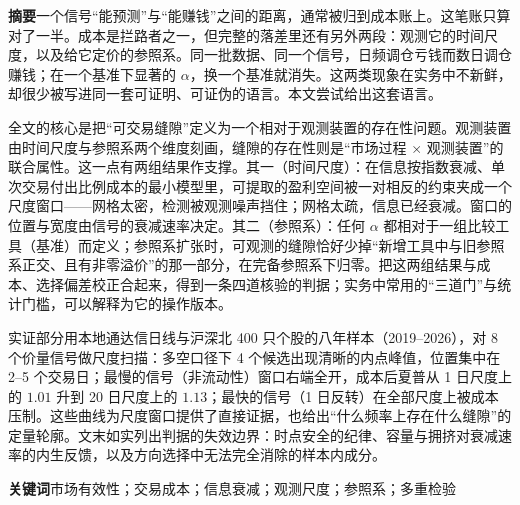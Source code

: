 \begin{center}
\begin{minipage}{0.92\textwidth}
\small
\noindent\textbf{摘要}\quad 一个信号“能预测”与“能赚钱”之间的距离，通常被归到成本账上。这笔账只算对了一半。成本是拦路者之一，但完整的落差里还有另外两段：观测它的时间尺度，以及给它定价的参照系。同一批数据、同一个信号，日频调仓亏钱而数日调仓赚钱；在一个基准下显著的 $\alpha$，换一个基准就消失。这两类现象在实务中不新鲜，却很少被写进同一套可证明、可证伪的语言。本文尝试给出这套语言。

全文的核心是把“可交易缝隙”定义为一个相对于观测装置的存在性问题。观测装置由时间尺度与参照系两个维度刻画，缝隙的存在性则是“市场过程 $\times$ 观测装置”的联合属性。这一点有两组结果作支撑。其一（时间尺度）：在信息按指数衰减、单次交易付出比例成本的最小模型里，可提取的盈利空间被一对相反的约束夹成一个尺度窗口——网格太密，检测被观测噪声挡住；网格太疏，信息已经衰减。窗口的位置与宽度由信号的衰减速率决定。其二（参照系）：任何 $\alpha$ 都相对于一组比较工具（基准）而定义；参照系扩张时，可观测的缝隙恰好少掉“新增工具中与旧参照系正交、且有非零溢价”的那一部分，在完备参照系下归零。把这两组结果与成本、选择偏差校正合起来，得到一条四道核验的判据；实务中常用的“三道门”与统计门槛，可以解释为它的操作版本。

实证部分用本地通达信日线与沪深北 400 只个股的八年样本（2019--2026），对 8 个价量信号做尺度扫描：多空口径下 4 个候选出现清晰的内点峰值，位置集中在 2--5 个交易日；最慢的信号（非流动性）窗口右端全开，成本后夏普从 1 日尺度上的 $1.01$ 升到 20 日尺度上的 $1.13$；最快的信号（1 日反转）在全部尺度上被成本压制。这些曲线为尺度窗口提供了直接证据，也给出“什么频率上存在什么缝隙”的定量轮廓。文末如实列出判据的失效边界：时点安全的纪律、容量与拥挤对衰减速率的内生反馈，以及方向选择中无法完全消除的样本内成分。

\vspace{0.5em}
\noindent\textbf{关键词}\quad 市场有效性；交易成本；信息衰减；观测尺度；参照系；多重检验
\end{minipage}
\end{center}

\newpage